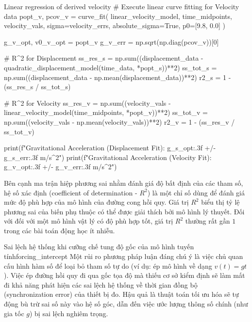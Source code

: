 \begin{pycode}{Linear regression of derived velocity}
# Execute linear curve fitting for Velocity data
popt_v, pcov_v = curve_fit(
    linear_velocity_model,
    time_midpoints,
    velocity_vals,
    sigma=velocity_errs,
    absolute_sigma=True,
    p0=[9.8, 0.0]
)

g_v_opt, v0_v_opt = popt_v
g_v_err = np.sqrt(np.diag(pcov_v))[0]

# R^2 for Displacement
ss_res_s = np.sum((displacement_data - quadratic_displacement_model(time_data, *popt_s))**2)
ss_tot_s = np.sum((displacement_data - np.mean(displacement_data))**2)
r2_s = 1 - (ss_res_s / ss_tot_s)

# R^2 for Velocity
ss_res_v = np.sum((velocity_vals - linear_velocity_model(time_midpoints, *popt_v))**2)
ss_tot_v = np.sum((velocity_vals - np.mean(velocity_vals))**2)
r2_v = 1 - (ss_res_v / ss_tot_v)

print(f"Gravitational Acceleration (Displacement Fit): {g_s_opt:.3f} +/- {g_s_err:.3f} m/s^2")
print(f"Gravitational Acceleration (Velocity Fit): {g_v_opt:.3f} +/- {g_v_err:.3f} m/s^2")
\end{pycode}

Bên cạnh ma trận hiệp phương sai nhằm đánh giá độ bất định của các tham số, hệ số xác định (coefficient of determination - $R^2$) là một chỉ số dùng để đánh giá mức độ phù hợp của mô hình của đường cong hồi quy. Giá trị $R^2$ biểu thị tỷ lệ phương sai của biến phụ thuộc có thể được giải thích bởi mô hình lý thuyết. Đối với đối với một mô hình vật lý có độ phù hợp tốt, giá trị $R^2$ thường rất gần $1$ trong các bài toán động học ít nhiễu.

\begin{pitfall}{Sai lệch hệ thống khi cưỡng chế tung độ gốc của mô hình tuyến tính}{forcing_intercept}
Một rủi ro phương pháp luận đáng chú ý là việc chủ quan cấu hình hàm số để loại bỏ tham số tự do (ví dụ: ép mô hình về dạng $v(t) = gt$). Việc ép đường hồi quy đi qua gốc tọa độ mà thiếu cơ sở kiểm định sẽ làm mất đi khả năng phát hiện các sai lệch hệ thống về thời gian đồng bộ (synchronization error) của thiết bị đo. Hậu quả là thuật toán tối ưu hóa sẽ tự động bù trừ sai số này vào hệ số góc, dẫn đến việc ước lượng thông số chính (như gia tốc $g$) bị sai lệch nghiêm trọng.
\end{pitfall}